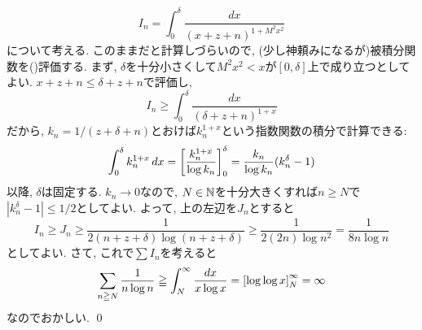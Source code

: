 {\begin{probans}
\[I_n= \int_{0}^{\delta} \dfrac{dx}{(x+z+n)^{1+M^2x^2}}\]
について考える. このままだと計算しづらいので, (少し神頼みになるが)被積分関数を()評価する. まず, $\delta$を十分小さくして$M^2x^2 < x$が$[0,\delta]$上で成り立つとしてよい. $x+z+n\leq \delta + z + n$で評価し,
\[I_n\geq \int_{0}^{\delta} \dfrac{dx}{(\delta + z +n)^{1+x}}\]
だから, $k_n = 1/(z+\delta + n)$とおけば$k_n^{1+x}$という指数関数の積分で計算できる:
\[\int_{0}^{\delta} k_n^{1+x}\, dx = \left[  \dfrac{k_n^{1+x}}{\log{k_n}} \right]_{0}^{\delta} = \dfrac{k_n}{\log{k_n}}(k_n^{\delta} - 1) \]
以降, $\delta$は固定する. $k_n\to 0$なので,  $N\in \mathbb{N}$を十分大きくすれば$n\geq N$で$|k_n^{\delta} - 1| \leq 1/2$としてよい. よって, 上の左辺を$J_n$とすると
\[I_n\geq J_n \geq \dfrac{1}{2(n+z+\delta)\log{(n+z+\delta)}} \geq \dfrac{1}{2(2n)\log{n^2}} = \dfrac{1}{8n\log{n}}\]
としてよい. さて, これで$\sum I_n$を考えると
\[\sum_{n\geqq N} \dfrac{1}{n\log{n}} \geqq \int_{N}^{\infty} \dfrac{dx}{x\log{x}} = \left[ \log{\log{x}} \right]_{N}^{\infty} = \infty \]
なのでおかしい. \qed

\end{probans}

\begin{probans}
\end{probans}
}































































\clearpage

